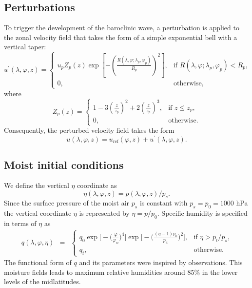 \documentclass[times,doublespace]{fldauth}
\begin{document}
\subsection{Perturbations}

To trigger the development of the baroclinic wave, a perturbation is applied to the zonal velocity field that takes the form of a simple exponential bell with a vertical taper:
\begin{equation}
u^\prime(\lambda, \varphi, z) = \left\{ \begin{array}{ll} \displaystyle u_p Z_p(z)  \exp \left[ - \left( \frac{R(\lambda, \varphi; \lambda_p, \varphi_p)}{R_p} \right)^2 \right], & \mbox{if $R(\lambda, \varphi; \lambda_p, \varphi_p) < R_p$,} \\ 0, & \mbox{otherwise,} \end{array} \right.
\end{equation} where
\begin{equation}
Z_p(z) = \left\{ \begin{array}{ll} \displaystyle 1 - 3 \left( \frac{z}{z_p} \right)^2 + 2 \left( \frac{z}{z_p} \right)^3, & \mbox{if $z \leq z_p$,} \\ 0, & \mbox{otherwise.} \end{array} \right.
\end{equation}  Consequently, the perturbed velocity field takes the form
\begin{equation}
u(\lambda, \varphi, z) = u_{\text{ref}}(\varphi, z) + u^\prime(\lambda, \varphi, z).
\end{equation}

\subsection{Moist initial conditions}

We define the vertical $\eta$ coordinate as
\begin{equation}
\eta(\lambda, \varphi, z) = p(\lambda, \varphi, z) / p_s.
\end{equation}  Since the surface pressure of the moist air $p_s$ is constant with $p_s = p_0 = 1000$ hPa  the vertical coordinate $\eta$ is represented by $\eta = p/p_0$.  Specific humidity is specified in terms of $\eta$ as
\begin{eqnarray}
q(\lambda, \varphi, \eta) &=& \left\{ \begin{array}{ll} \displaystyle q_0 \exp\Bigg[- \Big(\frac{\varphi}{\varphi_{w}}\Big)^4 \Bigg] \exp\Bigg[- \Bigg(\frac{(\eta-1)p_0}{p_{w}}\Bigg)^2  \Bigg], & \mbox{if $\eta > p_t / p_s$,} \\ q_{t}, & \mbox{otherwise.} \end{array} \right.
\end{eqnarray} The functional form of $q$ and its parameters were inspired by observations. This moisture fields leads to maximum relative humidities around 85\% in the lower levels of the midlatitudes.
\end{document}

